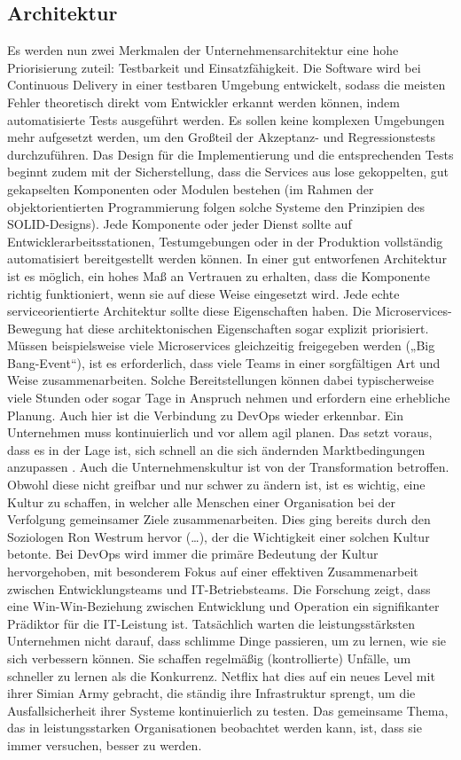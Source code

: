 \subsection{Architektur}
Es werden nun zwei Merkmalen der Unternehmensarchitektur eine hohe Priorisierung zuteil: Testbarkeit und Einsatzfähigkeit. Die Software wird bei Continuous Delivery in einer testbaren Umgebung entwickelt, sodass die meisten Fehler theoretisch direkt vom Entwickler erkannt werden können, indem automatisierte Tests ausgeführt werden. Es sollen keine komplexen Umgebungen mehr aufgesetzt werden, um den Großteil der Akzeptanz- und Regressionstests durchzuführen. Das Design für die Implementierung und die entsprechenden Tests beginnt zudem mit der Sicherstellung, dass die Services aus lose gekoppelten, gut gekapselten Komponenten oder Modulen bestehen (im Rahmen der objektorientierten Programmierung folgen solche Systeme den Prinzipien des SOLID-Designs). Jede Komponente oder jeder Dienst sollte auf Entwicklerarbeitsstationen, Testumgebungen oder in der Produktion vollständig automatisiert bereitgestellt werden können. In einer gut entworfenen Architektur ist es möglich, ein hohes Maß an Vertrauen zu erhalten, dass die Komponente richtig funktioniert, wenn sie auf diese Weise eingesetzt wird. Jede echte serviceorientierte Architektur sollte diese Eigenschaften haben. Die Microservices-Bewegung hat diese architektonischen Eigenschaften sogar explizit priorisiert. Müssen beispielsweise viele Microservices gleichzeitig freigegeben werden („Big Bang-Event“), ist es erforderlich, dass viele Teams in einer sorgfältigen Art und Weise zusammenarbeiten. Solche Bereitstellungen können dabei typischerweise viele Stunden oder sogar Tage in Anspruch nehmen und erfordern eine erhebliche Planung. Auch hier ist die Verbindung zu DevOps wieder erkennbar. Ein Unternehmen muss kontinuierlich und vor allem agil planen. Das setzt voraus, dass es in der Lage ist, sich schnell an die sich ändernden Marktbedingungen anzupassen \cite{continuousdelivery.2017}.
Auch die Unternehmenskultur ist von der Transformation betroffen. Obwohl diese nicht greifbar und nur schwer zu ändern ist, ist es wichtig, eine Kultur zu schaffen, in welcher alle Menschen einer Organisation bei der Verfolgung gemeinsamer Ziele zusammenarbeiten. Dies ging bereits durch den Soziologen Ron Westrum hervor (…), der die Wichtigkeit einer solchen Kultur betonte.
Bei DevOps wird immer die primäre Bedeutung der Kultur hervorgehoben, mit besonderem Fokus auf einer effektiven Zusammenarbeit zwischen Entwicklungsteams und IT-Betriebsteams. Die Forschung zeigt, dass eine Win-Win-Beziehung zwischen Entwicklung und Operation ein signifikanter Prädiktor für die IT-Leistung ist. 
Tatsächlich warten die leistungsstärksten Unternehmen nicht darauf, dass schlimme Dinge passieren, um zu lernen, wie sie sich verbessern können. Sie schaffen regelmäßig (kontrollierte) Unfälle, um schneller zu lernen als die Konkurrenz. Netflix hat dies auf ein neues Level mit ihrer Simian Army gebracht, die ständig ihre Infrastruktur sprengt, um die Ausfallsicherheit ihrer Systeme kontinuierlich zu testen.
Das gemeinsame Thema, das in leistungsstarken Organisationen beobachtet werden kann, ist, dass sie immer versuchen, besser zu werden. 

